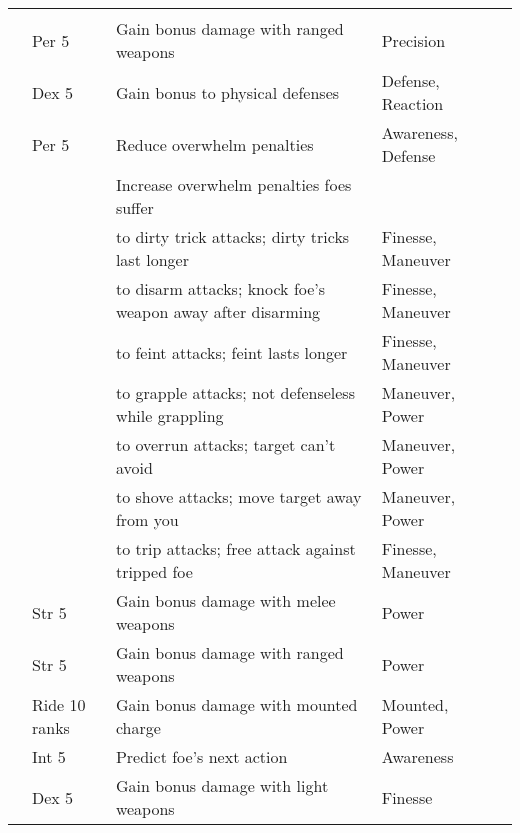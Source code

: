 \begin{longtabuwrapper}
\begin{longtabu}{>{\lcol}p{10em} >{\lcol}p{15em} >{\lcol}X >{\lcol}p{6em} >{\lcol}p{3em}}
        \midrule
         &  &  &  &  \\
         & Per 5 & Gain bonus damage with ranged weapons & Precision &  \\
         & Dex 5 & Gain bonus to physical defenses & Defense, Reaction &  \\
         & Per 5 & Reduce overwhelm penalties & Awareness, Defense &  \\
         & \x & Increase overwhelm penalties foes suffer & \x &  \\
         & \x &  to dirty trick attacks; dirty tricks last longer & Finesse, Maneuver &  \\
         & \x &  to disarm attacks; knock foe's weapon away after disarming & Finesse, Maneuver &  \\
         & \x &  to feint attacks; feint lasts longer & Finesse, Maneuver &  \\
         & \x &  to grapple attacks; not defenseless while grappling & Maneuver, Power &  \\
         & \x &  to overrun attacks; target can't avoid & Maneuver, Power &  \\
         & \x &  to shove attacks; move target away from you & Maneuver, Power &  \\
         & \x &  to trip attacks; free attack against tripped foe & Finesse, Maneuver &  \\
         & Str 5 & Gain bonus damage with melee weapons & Power &  \\
         & Str 5 & Gain bonus damage with ranged weapons & Power &  \\
         & Ride 10 ranks & Gain bonus damage with mounted charge & Mounted, Power &  \\
         & Int 5 & Predict foe's next action & Awareness &  \\
         & Dex 5 & Gain bonus damage with light weapons & Finesse &  \\


\end{longtabu}
\end{longtabuwrapper}
